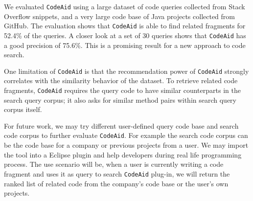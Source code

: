 \documentclass[conference]{IEEEtran}
\newcommand{\ttt}[1]{\tt\small{#1}}
\newcommand{\tool}{{\ttt CodeAid}}
\begin{document}
We evaluated {\tool} using a large dataset of code queries collected
from Stack Overflow snippets, and a very large code base of Java
projects collected from GitHub. The evaluation shows that {\tool} is
able to find related fragments for 52.4\% of the queries. A closer look at a set of 30
queries shows that {\tool} has a good precision of 75.6\%. This is
a promising result for a new approach to code search. 

One limitation of {\tool} is that the recommendation power of {\tool} strongly correlates with the similarity behavior of the dataset. To retrieve related code fragments, {\tool} requires the query code to have similar counterparts in the search query corpus; it also asks for similar method pairs within search query corpus itself. 

For future work, we may try different user-defined query code base and search code corpus to further evaluate {\tool}. For example the search code corpus can be the code base for a company or previous projects from a user. We may import the tool into a Eclipse plugin and help developers during real life programming process. The use scenario will be, when a user is currently writing a code fragment and uses it as query to search {\tool} plug-in, we will return the ranked list of related code from the company's code base or the user's own projects.





\end{document}

